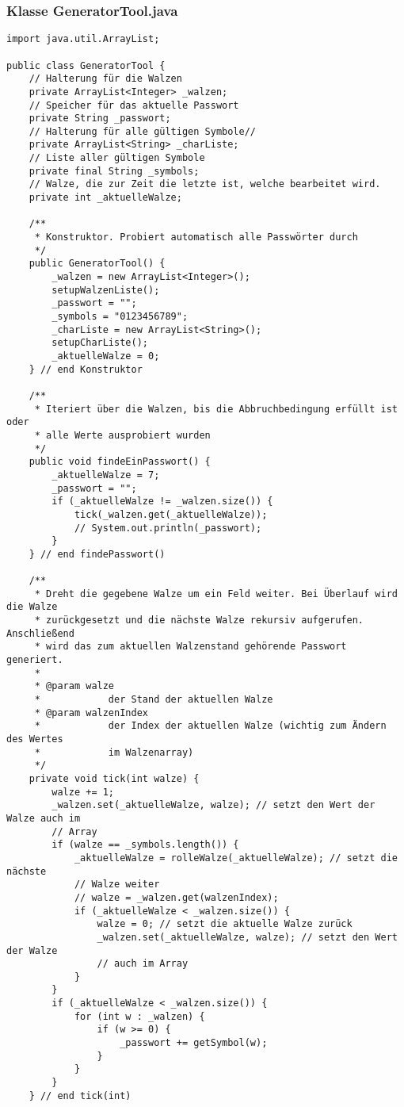 \documentclass[twoside]{article}
\begin{document}
\subsubsection*{Klasse GeneratorTool.java}
\begin{lstlisting}
import java.util.ArrayList;

public class GeneratorTool {
	// Halterung für die Walzen
	private ArrayList<Integer> _walzen;
	// Speicher für das aktuelle Passwort
	private String _passwort;
	// Halterung für alle gültigen Symbole//
	private ArrayList<String> _charListe;
	// Liste aller gültigen Symbole
	private final String _symbols;
	// Walze, die zur Zeit die letzte ist, welche bearbeitet wird.
	private int _aktuelleWalze;

	/**
	 * Konstruktor. Probiert automatisch alle Passwörter durch
	 */
	public GeneratorTool() {
		_walzen = new ArrayList<Integer>();
		setupWalzenListe();
		_passwort = "";
		_symbols = "0123456789";
		_charListe = new ArrayList<String>();
		setupCharListe();
		_aktuelleWalze = 0;
	} // end Konstruktor

	/**
	 * Iteriert über die Walzen, bis die Abbruchbedingung erfüllt ist oder
	 * alle Werte ausprobiert wurden
	 */
	public void findeEinPasswort() {
		_aktuelleWalze = 7;
		_passwort = "";
		if (_aktuelleWalze != _walzen.size()) {
			tick(_walzen.get(_aktuelleWalze));
			// System.out.println(_passwort);
		}
	} // end findePasswort()

	/**
	 * Dreht die gegebene Walze um ein Feld weiter. Bei Überlauf wird die Walze
	 * zurückgesetzt und die nächste Walze rekursiv aufgerufen. Anschließend
	 * wird das zum aktuellen Walzenstand gehörende Passwort generiert.
	 * 
	 * @param walze
	 *            der Stand der aktuellen Walze
	 * @param walzenIndex
	 *            der Index der aktuellen Walze (wichtig zum Ändern des Wertes
	 *            im Walzenarray)
	 */
	private void tick(int walze) {
		walze += 1;
		_walzen.set(_aktuelleWalze, walze); // setzt den Wert der Walze auch im
		// Array
		if (walze == _symbols.length()) {
			_aktuelleWalze = rolleWalze(_aktuelleWalze); // setzt die nächste
			// Walze weiter
			// walze = _walzen.get(walzenIndex);
			if (_aktuelleWalze < _walzen.size()) {
				walze = 0; // setzt die aktuelle Walze zurück
				_walzen.set(_aktuelleWalze, walze); // setzt den Wert der Walze
				// auch im Array
			}
		}
		if (_aktuelleWalze < _walzen.size()) {
			for (int w : _walzen) {
				if (w >= 0) {
					_passwort += getSymbol(w);
				}
			}
		}
	} // end tick(int)


\end{lstlisting}
\end{document}

